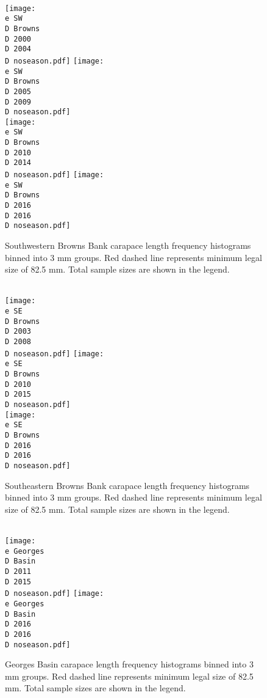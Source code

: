 \documentclass[11pt]{article}
\newcommand{\D}{.}
\newcommand{\e}{/backup/bio_data/bio.lobster/figures/} %
\begin{document}

\begin{figure}
\centering
    \\
    			\texttt{[image: \\e SW\\D Browns\\D 2000\\D 2004\\D noseason.pdf]}
    			\texttt{[image: \\e SW\\D Browns\\D 2005\\D 2009\\D noseason.pdf]}\\
    			\texttt{[image: \\e SW\\D Browns\\D 2010\\D 2014\\D noseason.pdf]}
    			\texttt{[image: \\e SW\\D Browns\\D 2016\\D 2016\\D noseason.pdf]}    
    \caption{Southwestern Browns Bank carapace length frequency histograms binned into 3 mm groups. Red dashed line represents minimum legal size of 82.5 mm. Total sample sizes are shown in the legend.}

\end{figure}


\begin{figure}
\centering
    \\
    			\texttt{[image: \\e SE\\D Browns\\D 2003\\D 2008\\D noseason.pdf]}
    			\texttt{[image: \\e SE\\D Browns\\D 2010\\D 2015\\D noseason.pdf]}\\
    			\texttt{[image: \\e SE\\D Browns\\D 2016\\D 2016\\D noseason.pdf]}
    
    \caption{Southeastern Browns Bank carapace length frequency histograms binned into 3 mm groups. Red dashed line represents minimum legal size of 82.5 mm. Total sample sizes are shown in the legend.}

\end{figure}


\begin{figure}
\centering
    \\
    			\texttt{[image: \\e Georges\\D Basin\\D 2011\\D 2015\\D noseason.pdf]}
    			\texttt{[image: \\e Georges\\D Basin\\D 2016\\D 2016\\D noseason.pdf]}
    
    \caption{Georges Basin carapace length frequency histograms binned into 3 mm groups. Red dashed line represents minimum legal size of 82.5 mm. Total sample sizes are shown in the legend.}

\end{figure}
\end{document}
